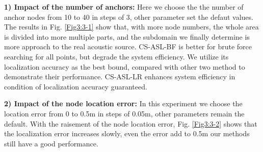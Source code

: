\textbf{1) Impact of the number of anchors:}
 Here we choose the the number of anchor nodes from 10 to 40 in steps of 3, other parameter set the defaut values.
The results in Fig. \ref{Fig3:3-1} show that, with more node numbers, the whole area is divided into more multiple parts, and the subdomain we finally determine is more approach to the real acoustic source.
CS-ASL-BF is better for brute force searching for all points, but degrade the system efficiency. We utilize its localization accuracy as the best bound, compared with other two method to demonstrate  their performance. CS-ASL-LR enhances system efficiency in condition of localization accuracy guaranteed.

		
\textbf{2) Impact of the node location error:}
In this experiment we choose the location error from 0 to 0.5m in steps of 0.05m, other parameters remain the default. With the raisement of the node location error, Fig. \ref{Fig3:3-2} shows that the localization error increases slowly, even the error add to 0.5m our methods still have a good performance. 

